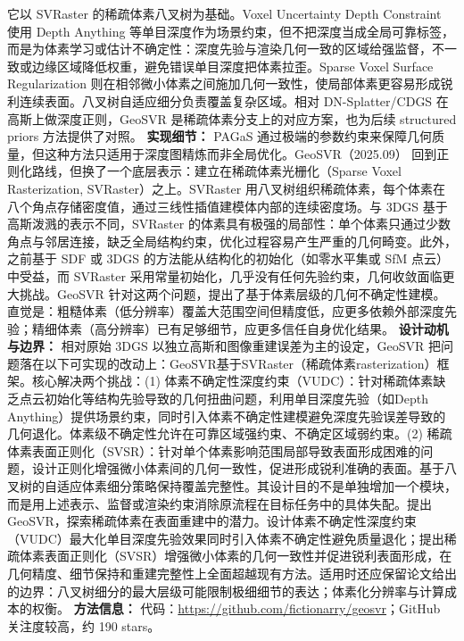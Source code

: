 它以 SVRaster 的稀疏体素八叉树为基础。Voxel Uncertainty Depth Constraint 使用 Depth Anything 等单目深度作为场景约束，但不把深度当成全局可靠标签，而是为体素学习或估计不确定性：深度先验与渲染几何一致的区域给强监督，不一致或边缘区域降低权重，避免错误单目深度把体素拉歪。Sparse Voxel Surface Regularization 则在相邻微小体素之间施加几何一致性，使局部体素更容易形成锐利连续表面。八叉树自适应细分负责覆盖复杂区域。相对 DN-Splatter/CDGS 在高斯上做深度正则，GeoSVR 是稀疏体素分支上的对应方案，也为后续 structured priors 方法提供了对照。
\textbf{实现细节：} PAGaS 通过极端的参数约束来保障几何质量，但这种方法只适用于深度图精炼而非全局优化。GeoSVR（2025.09） 回到正则化路线，但换了一个底层表示：建立在稀疏体素光栅化（Sparse Voxel Rasterization, SVRaster）之上。SVRaster 用八叉树组织稀疏体素，每个体素在八个角点存储密度值，通过三线性插值建模体内部的连续密度场。与 3DGS 基于高斯泼溅的表示不同，SVRaster 的体素具有极强的局部性：单个体素只通过少数角点与邻居连接，缺乏全局结构约束，优化过程容易产生严重的几何畸变。此外，之前基于 SDF 或 3DGS 的方法能从结构化的初始化（如零水平集或 SfM 点云）中受益，而 SVRaster 采用常量初始化，几乎没有任何先验约束，几何收敛面临更大挑战。GeoSVR 针对这两个问题，提出了基于体素层级的几何不确定性建模。直觉是：粗糙体素（低分辨率）覆盖大范围空间但精度低，应更多依赖外部深度先验；精细体素（高分辨率）已有足够细节，应更多信任自身优化结果。
\textbf{设计动机与边界：} 相对原始 3DGS 以独立高斯和图像重建误差为主的设定，GeoSVR 把问题落在以下可实现的改动上：GeoSVR基于SVRaster（稀疏体素rasterization）框架。核心解决两个挑战：(1) 体素不确定性深度约束（VUDC）：针对稀疏体素缺乏点云初始化等结构先验导致的几何扭曲问题，利用单目深度先验（如Depth Anything）提供场景约束，同时引入体素不确定性建模避免深度先验误差导致的几何退化。体素级不确定性允许在可靠区域强约束、不确定区域弱约束。(2) 稀疏体素表面正则化（SVSR）：针对单个体素影响范围局部导致表面形成困难的问题，设计正则化增强微小体素间的几何一致性，促进形成锐利准确的表面。基于八叉树的自适应体素细分策略保持覆盖完整性。其设计目的不是单独增加一个模块，而是用上述表示、监督或渲染约束消除原流程在目标任务中的具体失配。提出GeoSVR，探索稀疏体素在表面重建中的潜力。设计体素不确定性深度约束（VUDC）最大化单目深度先验效果同时引入体素不确定性避免质量退化；提出稀疏体素表面正则化（SVSR）增强微小体素的几何一致性并促进锐利表面形成，在几何精度、细节保持和重建完整性上全面超越现有方法。适用时还应保留论文给出的边界：八叉树细分的最大层级可能限制极细细节的表达；体素化分辨率与计算成本的权衡。
\textbf{方法信息：} 代码：\url{https://github.com/fictionarry/geosvr}；GitHub 关注度较高，约 190 stars。



